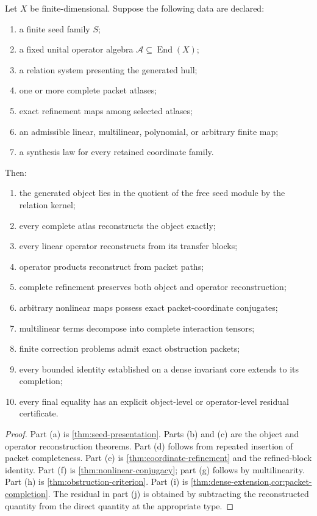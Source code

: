 \begin{theorem}\label{thm:seed-to-reconstruction}
Let $X$ be finite-dimensional.  Suppose the following data are declared:
\begin{enumerate}[label=(\roman*),leftmargin=2em]
\item a finite seed family $S$;
\item a fixed unital operator algebra $\mathcal A\subseteq\operatorname{End}(X)$;
\item a relation system presenting the generated hull;
\item one or more complete packet atlases;
\item exact refinement maps among selected atlases;
\item an admissible linear, multilinear, polynomial, or arbitrary finite map;
\item a synthesis law for every retained coordinate family.
\end{enumerate}
Then:
\begin{enumerate}[label=(\alph*),leftmargin=2em]
\item the generated object lies in the quotient of the free seed module by the relation kernel;
\item every complete atlas reconstructs the object exactly;
\item every linear operator reconstructs from its transfer blocks;
\item operator products reconstruct from packet paths;
\item complete refinement preserves both object and operator reconstruction;
\item arbitrary nonlinear maps possess exact packet-coordinate conjugates;
\item multilinear terms decompose into complete interaction tensors;
\item finite correction problems admit exact obstruction packets;
\item every bounded identity established on a dense invariant core extends to its completion;
\item every final equality has an explicit object-level or operator-level residual certificate.
\end{enumerate}
\end{theorem}

\begin{proof}
Part (a) is \cref{thm:seed-presentation}.  Parts (b) and (c) are the object and operator reconstruction theorems.  Part (d) follows from repeated insertion of packet completeness.  Part (e) is \cref{thm:coordinate-refinement} and the refined-block identity.  Part (f) is \cref{thm:nonlinear-conjugacy}; part (g) follows by multilinearity.  Part (h) is \cref{thm:obstruction-criterion}.  Part (i) is \cref{thm:dense-extension,cor:packet-completion}.  The residual in part (j) is obtained by subtracting the reconstructed quantity from the direct quantity at the appropriate type.
\end{proof}

